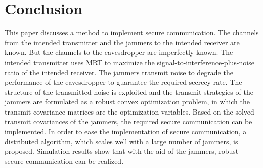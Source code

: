 \documentclass[conference]{IEEEtran}
\begin{document}




\section{Conclusion} \label{sec:conclusion}
This paper discusses a method to implement secure communication. The channels from the intended transmitter and the jammers to the intended receiver are known. But the channels to the eavesdropper are imperfectly known. The intended transmitter uses MRT to maximize the signal-to-interference-plus-noise ratio of the intended receiver. The jammers transmit noise to degrade the performance of the eavesdropper to guarantee the required secrecy rate. The structure of the transmitted noise is exploited and the transmit strategies of the jammers are formulated as a robust convex optimization problem, in which the transmit covariance matrices are the optimization variables. Based on the solved transmit covariances of the jammers, the required secure communication can be implemented. In order to ease the implementation of secure communication, a distributed algorithm, which scales well with a large number of jammers, is proposed. Simulation results show that with the aid of the jammers, robust secure communication can be realized.













\end{document}
